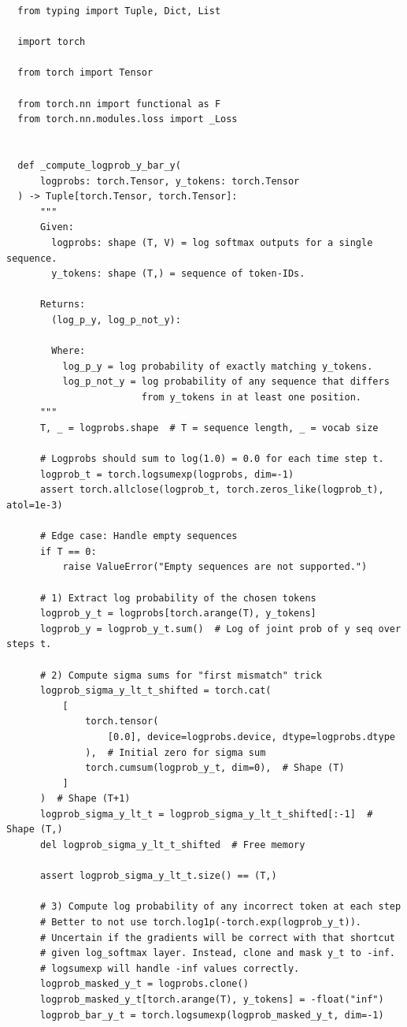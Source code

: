 \documentclass[twoside,11pt]{article}
\begin{document}
\begin{verbatim}
  from typing import Tuple, Dict, List

  import torch
  
  from torch import Tensor
  
  from torch.nn import functional as F
  from torch.nn.modules.loss import _Loss
  
  
  def _compute_logprob_y_bar_y(
      logprobs: torch.Tensor, y_tokens: torch.Tensor
  ) -> Tuple[torch.Tensor, torch.Tensor]:
      """
      Given:
        logprobs: shape (T, V) = log softmax outputs for a single sequence.
        y_tokens: shape (T,) = sequence of token-IDs.
  
      Returns:
        (log_p_y, log_p_not_y):
  
        Where:
          log_p_y = log probability of exactly matching y_tokens.
          log_p_not_y = log probability of any sequence that differs
                        from y_tokens in at least one position.
      """
      T, _ = logprobs.shape  # T = sequence length, _ = vocab size
  
      # Logprobs should sum to log(1.0) = 0.0 for each time step t.
      logprob_t = torch.logsumexp(logprobs, dim=-1)
      assert torch.allclose(logprob_t, torch.zeros_like(logprob_t), atol=1e-3)
  
      # Edge case: Handle empty sequences
      if T == 0:
          raise ValueError("Empty sequences are not supported.")
  
      # 1) Extract log probability of the chosen tokens
      logprob_y_t = logprobs[torch.arange(T), y_tokens]
      logprob_y = logprob_y_t.sum()  # Log of joint prob of y seq over steps t.
  
      # 2) Compute sigma sums for "first mismatch" trick
      logprob_sigma_y_lt_t_shifted = torch.cat(
          [
              torch.tensor(
                  [0.0], device=logprobs.device, dtype=logprobs.dtype
              ),  # Initial zero for sigma sum
              torch.cumsum(logprob_y_t, dim=0),  # Shape (T)
          ]
      )  # Shape (T+1)
      logprob_sigma_y_lt_t = logprob_sigma_y_lt_t_shifted[:-1]  # Shape (T,)
      del logprob_sigma_y_lt_t_shifted  # Free memory
  
      assert logprob_sigma_y_lt_t.size() == (T,)
  
      # 3) Compute log probability of any incorrect token at each step
      # Better to not use torch.log1p(-torch.exp(logprob_y_t)).
      # Uncertain if the gradients will be correct with that shortcut
      # given log_softmax layer. Instead, clone and mask y_t to -inf.
      # logsumexp will handle -inf values correctly.
      logprob_masked_y_t = logprobs.clone()
      logprob_masked_y_t[torch.arange(T), y_tokens] = -float("inf")
      logprob_bar_y_t = torch.logsumexp(logprob_masked_y_t, dim=-1)
  

\end{verbatim}
\end{document}
